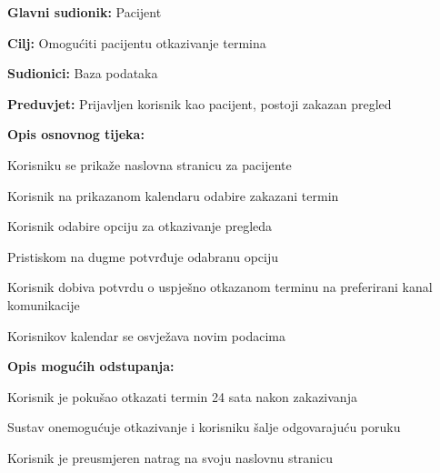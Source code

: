 					
					\noindent {}
					\begin{packed_item}
	
						\item \textbf{Glavni sudionik: }Pacijent
						\item  \textbf{Cilj:} Omogućiti pacijentu otkazivanje termina
						\item  \textbf{Sudionici:} Baza podataka
						\item  \textbf{Preduvjet:} Prijavljen korisnik kao pacijent,  postoji zakazan pregled
						\item  \textbf{Opis osnovnog tijeka:}
						
						\item[] \begin{packed_enum}
	
							\item Korisniku se prikaže naslovna stranicu za pacijente
							\item Korisnik na prikazanom kalendaru odabire zakazani termin
							\item Korisnik odabire opciju za otkazivanje pregleda
							\item Pristiskom na dugme potvrđuje odabranu opciju
							\item Korisnik dobiva potvrdu o uspješno otkazanom terminu na preferirani kanal komunikacije
							\item Korisnikov kalendar se osvježava novim podacima
							
						\end{packed_enum}
						
						\item  \textbf{Opis mogućih odstupanja:}
						
						\item[] \begin{packed_item}
	
							\item[2.a] Korisnik je pokušao otkazati termin 24 sata nakon zakazivanja
							\item[] \begin{packed_enum}
								
								\item Sustav onemogućuje otkazivanje i korisniku šalje odgovarajuću poruku
								\item Korisnik je preusmjeren natrag na svoju naslovnu stranicu
								
							\end{packed_enum}
						\end{packed_item}
						
					\end{packed_item}
					
